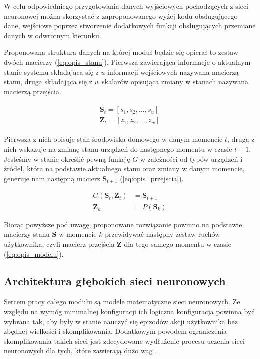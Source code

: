 W celu odpowiedniego przygotowania danych wyjściowych pochodzących z sieci neuronowej można skorzystać z zaproponowanego wyżej kodu obsługującego dane, wejściowe poprzez stworzenie dodatkowych funkcji obsługujących przemiane danych w odwrotnym kierunku.

Proponowana struktura danych na której moduł będzie się opierał to zestaw dwóch macierzy (\ref{eq:opis_stanu}). Pierwsza zawierająca informacje o aktualnym stanie systemu składająca się z $u$ informacji wejściowych nazywana macierzą stanu, druga składająca się z $w$ skalarów opisująca zmiany w stanach nazywana macierzą przejścia. 

\begin{align}
    \begin{split}
        \mathbf{S}_t = \left[s_1, s_2, \dots, s_u\right] \\
        \mathbf{Z}_t = \left[z_1, z_2, \dots, z_w\right]
    \end{split}
    \label{eq:opis_stanu}
\end{align}


Pierwsza z nich opisuje stan środowiska domowego w danym momencie $t$, druga z nich wskazuje na zmianę stanu urządzeń do następnego momentu w czasie $t+1$. Jesteśmy w stanie określić pewną funkcję $G$ w zależności od typów urządzeń i źródeł, która na podstawie aktualnego stanu oraz zmiany w danym momencie, generuje nam następną macierz $\mathbf{S}_{t+1}$ (\ref{eq:opis_przejscia}).

\begin{align}
    G\left(\mathbf{S}_t, \mathbf{Z}_t\right) &= \mathbf{S}_{t+1} \label{eq:opis_przejscia} \\
    \mathbf{Z}_k &= P(\mathbf{S}_k) \label{eq:opis_modelu}
\end{align}

Biorąc powyższe pod uwagę, proponowane rozwiązanie powinno na podstawie macierzy stanu $\mathbf{S}$ w momencie $k$ przewidywać następny zestaw ruchów użytkownika, czyli macierz przejścia $\mathbf{Z}$ dla tego samego momentu w czasie (\ref{eq:opis_modelu}).

\subsection{Architektura głębokich sieci neuronowych} \label{subsec:nn}
Sercem pracy całego modułu są modele matematyczne sieci neuronowych. Ze względu na wymóg minimalnej konfiguracji ich logiczna konfiguracja powinna być wybrana tak, aby były w stanie nauczyć się epizodów akcji użytkownika bez zbędnej wielkości i skomplikowania. Dodatkowym powodem ograniczenia skomplikowania takich sieci jest zdecydowane wydłużenie procesu uczenia sieci neuronowych dla tych, które zawierają dużo wag \cite{time_complexity_nn}.

